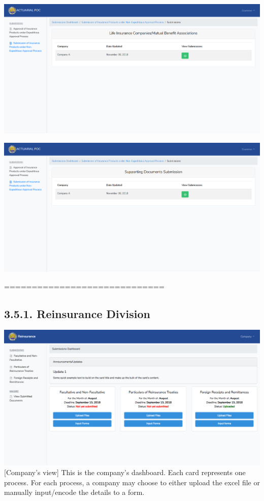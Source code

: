 \documentclass{article}
\begin{document}
\includegraphics[keepaspectratio=true]{up-ic-screens/image32}{}%

\includegraphics[keepaspectratio=true]{up-ic-screens/image43}{}%

\mdhr{}%

\noindent{}=============================%

\subsection{3.5.\hspace*{0.5em}1.  Reinsurance Division}\label{sec-1-reinsurance-division}%

\noindent{}\includegraphics[keepaspectratio=true]{up-ic-screens/image131}{}[Company’s view] This is the company’s dashboard. Each card
represents one process. For each process, a company may choose to either
upload the excel file or manually input/encode the details to a
form.%
\end{document}
